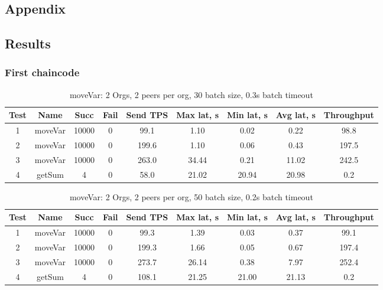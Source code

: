 \begin{appendices}
\chapter{Appendix}

\section{Results} \label{apdx:1}
\subsection{First chaincode} \label{apdx:fst}

\begin{table}[h!]
\begin{center}
\begin{tabular}{ |c|c|c|c|c|c|c|c|c| }
 \hline
  Test & Name & Succ  & Fail & Send TPS & Max lat, s & Min lat, s & Avg lat, s & Throughput \\
 \hline
 \hline
 1    & moveVar & 10000 & 0    & 99.1  & 1.10      & 0.02      & 0.22      & 98.8 \\
 \hline
 2    & moveVar & 10000 & 0    & 199.6 & 1.10      & 0.06      & 0.43      & 197.5 \\
 \hline
 3    & moveVar & 10000 & 0    & 263.0 & 34.44     & 0.21      & 11.02     & 242.5 \\
 \hline
 4    & getSum  & 4     & 0    & 58.0  & 21.02     & 20.94     & 20.98     & 0.2 \\
 \hline
\end{tabular}
\end{center}
\caption{moveVar: 2 Orgs, 2 peers per org, 30 batch size, 0.3s batch timeout}
\end{table}

\begin{table}[h!]
\begin{center}
\begin{tabular}{ |c|c|c|c|c|c|c|c|c| }
 \hline
  Test & Name & Succ  & Fail & Send TPS & Max lat, s & Min lat, s & Avg lat, s & Throughput \\
 \hline
 \hline
 1    & moveVar & 10000 & 0    & 99.3  & 1.39      & 0.03      & 0.37      & 99.1   \\
 \hline
 2    & moveVar & 10000 & 0    & 199.3 & 1.66      & 0.05      & 0.67      & 197.4  \\
 \hline
 3    & moveVar & 10000 & 0    & 273.7 & 26.14     & 0.38      & 7.97      & 252.4  \\
 \hline
 4    & getSum  & 4     & 0    & 108.1 & 21.25     & 21.00     & 21.13     & 0.2    \\
 \hline
\end{tabular}
\end{center}
\caption{moveVar: 2 Orgs, 2 peers per org, 50 batch size, 0.2s batch timeout}
\end{table}


\end{appendices}
